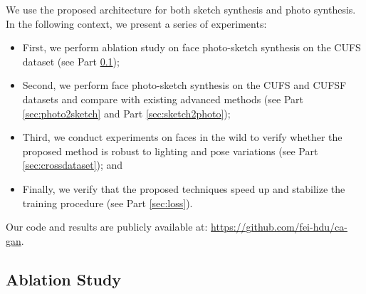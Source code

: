 \documentclass[journal]{IEEEtran}
\begin{document}
\bigskip We use the proposed architecture for both sketch synthesis and photo synthesis. In the following context, we present a series of experiments:
\begin{itemize}
\item First, we perform ablation study on face photo-sketch synthesis on the CUFS dataset (see Part \ref{sec:ablation}); 
\item Second, we perform face photo-sketch synthesis on the CUFS and CUFSF datasets and compare with existing advanced methods (see Part \ref{sec:photo2sketch} and Part \ref{sec:sketch2photo}); 
\item Third, we conduct experiments on faces in the wild to verify whether the proposed method is robust to lighting and pose variations (see Part \ref{sec:crossdataset}); and 
\item Finally, we verify that the proposed techniques speed up and stabilize the training procedure (see Part \ref{sec:loss}).
\end{itemize}
Our code and results are publicly available at: \url{https://github.com/fei-hdu/ca-gan}.




\subsection{Ablation Study}
\label{sec:ablation}
\end{document}
